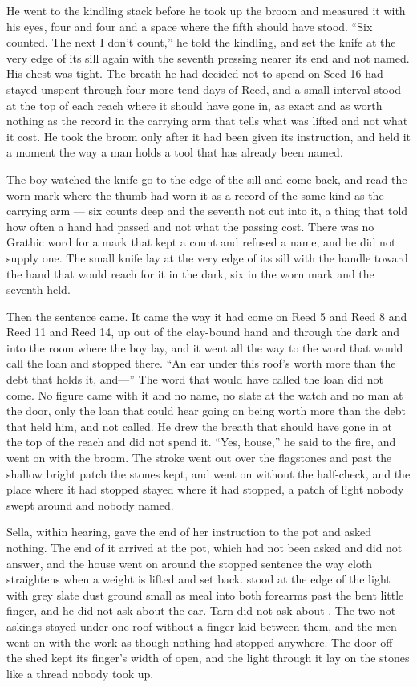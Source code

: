 He went to the kindling stack before he took up the broom and measured it with his eyes, four and four and a space where the fifth should have stood. “Six counted. The next I don't count,” he told the kindling, and set the knife at the very edge of its sill again with the seventh pressing nearer its end and not named. His chest was tight. The breath he had decided not to spend on Seed 16 had stayed unspent through four more tend-days of Reed, and a small interval stood at the top of each reach where it should have gone in, as exact and as worth nothing as the record in the carrying arm that tells what was lifted and not what it cost. He took the broom only after it had been given its instruction, and held it a moment the way a man holds a tool that has already been named.

The boy watched the knife go to the edge of the sill and come back, and read the worn mark where the thumb had worn it as a record of the same kind as the carrying arm --- six counts deep and the seventh not cut into it, a thing that told how often a hand had passed and not what the passing cost. There was no Grathic word for a mark that kept a count and refused a name, and he did not supply one. The small knife lay at the very edge of its sill with the handle toward the hand that would reach for it in the dark, six in the worn mark and the seventh held.

Then the sentence came. It came the way it had come on Reed 5 and Reed 8 and Reed 11 and Reed 14, up out of the clay-bound hand and through the dark and into the room where the boy lay, and it went all the way to the word that would call the loan and stopped there. “An ear under this roof's worth more than the debt that holds it, and---” The word that would have called the loan did not come. No figure came with it and no name, no slate at the watch and no man at the door, only the loan that could hear going on being worth more than the debt that held him, and not called. He drew the breath that should have gone in at the top of the reach and did not spend it. “Yes, house,” he said to the fire, and went on with the broom. The stroke went out over the flagstones and past the shallow bright patch the stones kept, and went on without the half-check, and the place where it had stopped stayed where it had stopped, a patch of light nobody swept around and nobody named.

Sella, within hearing, gave the end of her instruction to the pot and asked nothing. The end of it arrived at the pot, which had not been asked and did not answer, and the house went on around the stopped sentence the way cloth straightens when a weight is lifted and set back.  stood at the edge of the light with grey slate dust ground small as meal into both forearms past the bent little finger, and he did not ask about the ear. Tarn did not ask about . The two not-askings stayed under one roof without a finger laid between them, and the men went on with the work as though nothing had stopped anywhere. The door off the shed kept its finger's width of open, and the light through it lay on the stones like a thread nobody took up.

